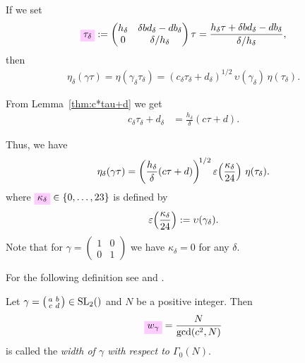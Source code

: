 \documentclass{article}
\begin{document}
If we set
\begin{gather}
  \defineNotation[tau-delta]{\tau_\delta}
  :=
  \begin{pmatrix}
    h_\delta & \delta b d_\delta-d b_\delta\\
    0       & \delta / h_\delta
  \end{pmatrix} \tau
  =
  \frac{h_\delta\tau+\delta b d_\delta-d b_\delta}{\delta/h_\delta},
  \label{eq:tau_delta}
\end{gather}
then
\begin{gather*}
  \eta_\delta(\gamma\tau)
  =
  \eta(\gamma_\delta \tau_\delta)
  =
  (c_\delta\tau_\delta+d_\delta)^{1/2}
  \,
  \upsilon(\gamma_\delta)
  \,
  \eta(\tau_\delta).
\end{gather*}


From Lemma~\ref{thm:c*tau+d} we get
\begin{align*}
  c_\delta\tau_\delta+d_\delta
  &=
  \frac{h_\delta}{\delta}(c \tau + d).
\end{align*}

Thus, we have
\begin{gather}
\eta_\delta(\gamma\tau)
=
\left(\frac{h_\delta}{\delta}(c \tau+d)\right)^{\!1/2}
\varepsilon\!\left(\frac{\kappa_\delta}{24}\right)
\,
\eta(\tau_\delta).
\label{eq:eta_delta(gamma*tau)}
\end{gather}
where
$\defineNotation[kappa-delta]{\kappa_\delta} \in \Set{0,\ldots,23}$ is
defined by
\begin{gather}
  \label{eq:kappa_delta}
  \varepsilon\!\left(\frac{\kappa_\delta}{24}\right) := \upsilon(\gamma_\delta).
\end{gather}
Note that for
$\gamma=\left(\begin{smallmatrix}1&0\\0&1\end{smallmatrix}\right)$ we
have $\kappa_\delta=0$ for any $\delta$.


For the following definition see \cite[Lemma~2.37]{Radu:PhD:2010} and
\cite[Definition~2.9]{Radu:PhD:2010}.

\begin{Definition}\label{def:width0}
  Let
  $\gamma=\left(\begin{smallmatrix}a&b\\c&d\end{smallmatrix}\right)
  \in \SL2Z$ and $N$ be a positive integer. Then
  \begin{gather}
    \defineNotation[w-gamma]{w_\gamma} = \frac{N}{\gcd(c^2, N)}
    \label{eq:width0}
  \end{gather}
  is called the \emph{width of $\gamma$ with respect to $\Gamma_0(N)$}.
\end{Definition}
\end{document}

